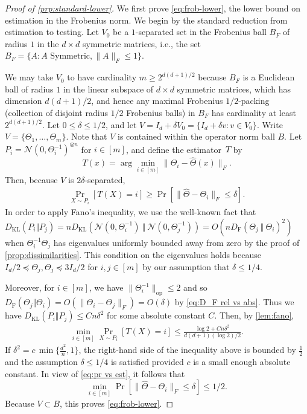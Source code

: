\documentclass[aos]{imsart}
\theoremstyle{definition}
\numberwithin{equation}{section}
\DeclareMathOperator{\op}{op}
\newcommand{\htheta}{\widehat{\Theta}}
\newcommand{\ot}{\otimes}
\newcommand{\DF}{D_{\operatorname{F}}}
\newcommand{\DKL}{D_{\operatorname{KL}}}
\begin{document}
\begin{proof}[Proof of \cref{prp:standard-lower}]
We first prove \cref{eq:frob-lower}, the lower bound on estimation in the Frobenius norm.
We begin by the standard reduction from estimation to testing.
Let $V_0$ be a $1$-separated set in the Frobenius ball $B_F$ of radius $1$ in the $d\times d$ symmetric matrices, i.e., the set $B_F = \{A: A \text{ Symmetric}, \|A\|_F \leq 1\}$.

We may take $V_0$ to have cardinality $m \geq 2^{d(d+1)/2}$ because $B_F$ is a Euclidean ball of radius $1$ in the linear subspace of $d\times d$ symmetric matrices, which has dimension $d(d+1)/2$, and hence any maximal Frobenius $1/2$-packing (collection of disjoint radius $1/2$ Frobenius balls) in $B_F$ has cardinality at least $2^{d(d+1)/2}$.
Let $0 \leq \delta \leq 1/2$, and let $V = I_d + \delta V_0 = \{I_d + \delta v: v \in V_0\}$.
Write $V = \{\Theta_1, \dots, \Theta_m\}$.
Note that $V$ is contained within the operator norm ball $B$.
Let $P_i =\mathcal{N}(0, \Theta^{-1}_i)^{\ot n}$ for $i\in[m]$, and define the estimator~$T$ by
\[ T(x) = \arg\min_{i \in [m]} \|\Theta_i - \htheta(x)\|_F. \]
Then, because $V$ is $2\delta$-separated,
\begin{align}\label{eq:pr vs est}
  \Pr_{X \sim P_i} \left[T(X) = i\right] \geq \Pr\left[\|\htheta -  \Theta_i\|_F \leq \delta\right].
\end{align}
In order to apply Fano's inequality, we use the well-known fact that $\DKL(P_i\Vert  P_j) = n \DKL(\mathcal{N}(0, \Theta_i^{-1})\ \Vert  \ \mathcal{N}(0, \Theta_j^{-1})) = O(n\DF(\Theta_j \ \Vert  \ \Theta_i)^2)$ when $\Theta_i^{-1}\Theta_j$ has eigenvalues uniformly bounded away from zero by the proof of \cref{prop:dissimilarities}.
This condition on the eigenvalues holds because $I_d/2 \preceq \Theta_j, \Theta_j \preceq 3I_d/2$ for $i,j \in [m]$ by our assumption that $\delta \leq 1/4$.

Moreover, for $i \in [m]$, we have $\|\Theta_i^{-1}\|_{\op} \leq 2$ and so $\DF(\Theta_j\Vert  \Theta_i) = O( \|\Theta_i - \Theta_j\|_F) = O(\delta)$ by \cref{eq:D_F rel vs abs}.
Thus we have $\DKL(P_i\Vert  P_j) \leq Cn \delta^2$ for some absolute constant $C$.
Then, by \cref{lem:fano}, 
\begin{align*}
  \min_{i \in [m]} \Pr_{X \sim P_i}[T(X) = i] \leq \frac{  \log 2 + C n \delta^2}{d(d+1)(\log 2)/2 }.
\end{align*}
If $\delta^2 = c \, \min\{ \frac{d^2}{n}, 1\}$, the right-hand side of the inequality above is bounded by $\frac{1}{2}$ and the assumption $\delta \leq 1/4$ is satisfied provided $c$ is a small enough absolute constant.
In view of \cref{eq:pr vs est}, it follows that
\[ \min_{i \in [m]} \Pr\left[ \|\htheta - \Theta_i\|_F \leq \delta\right] \leq 1/2. \]
Because $V \subset B$, this proves \cref{eq:frob-lower}.


\end{proof}
\end{document}
